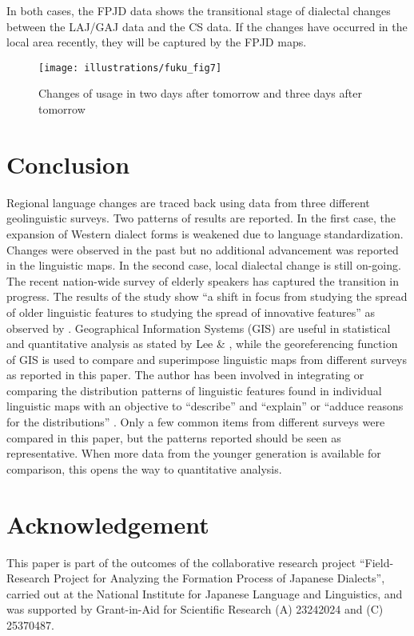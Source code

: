 \documentclass[output=paper]{LSP/langsci}
\begin{document}
In both cases, the FPJD data shows the transitional stage of dialectal changes between the LAJ/GAJ data and the CS data. If the changes have occurred in the local area recently, they will be captured by the FPJD maps.

\begin{figure}
\texttt{[image: illustrations/fuku\_fig7]}
\caption{Changes of usage in {\textquotedbl}two days after tomorrow{\textquotedbl} and {\textquotedbl}three days after tomorrow{\textquotedbl}}
\label{fig:7}
\end{figure}

\section{Conclusion}

Regional language changes are traced back using data from three different geolinguistic surveys.  Two patterns of results are reported.  In the first case, the expansion of Western dialect forms is weakened due to language standardization.  Changes were observed in the past but no additional advancement was reported in the linguistic maps.  In the second case, local dialectal change is still on-going.  The recent nation-wide survey of elderly speakers has captured the transition in progress.  The results of the study show “a shift in focus from studying the spread of older linguistic features to studying the spread of innovative features” as observed by \citet[412]{gordon_changes_2000}.  Geographical Information Systems (GIS) are useful in statistical and quantitative analysis as stated by Lee \& \citet{lee_spatial_1993}, while the georeferencing function of GIS is used to compare and superimpose linguistic maps from different surveys as reported in this paper.  The author has been involved in integrating or comparing the distribution patterns of linguistic features found in individual linguistic maps with an objective to “describe” and “explain” or “adduce reasons for the distributions” \citep[216]{trudgill_linguistic_1974}.  Only a few common items from different surveys were compared in this paper, but the patterns reported should be seen as representative. When more data from the younger generation is available for comparison, this opens the way to quantitative analysis.

\section*{Acknowledgement}

This paper is part of the outcomes of the collaborative research project “Field-Research Project for Analyzing the Formation Process of Japanese Dialects”, carried out at the National Institute for Japanese Language and Linguistics, and was supported by Grant-in-Aid for Scientific Research (A) 23242024 and (C) 25370487.

\printbibliography[heading=subbibliography,notkeyword=this]
\end{document}
